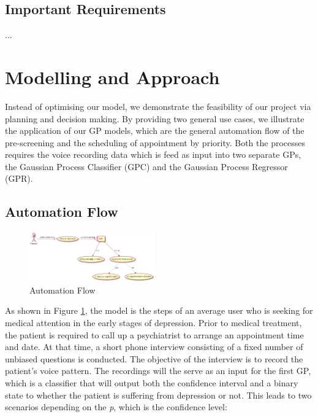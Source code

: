 \documentclass{article}
\begin{document}
	\subsection{Important Requirements}
	...
	
	\section{Modelling and Approach}
	Instead of optimising our model, we demonstrate the feasibility of our project via planning and decision making.
	By providing two general use cases, we illustrate the application of our GP models, which are the general automation flow of the pre-screening and the scheduling of appointment by priority.
	Both the processes requires the voice recording data which is feed as input into two separate GPs, the Gaussian Process Classifier (GPC) and the Gaussian Process Regressor (GPR). 

	\subsection{Automation Flow} \label{af}
	\begin{figure}[h]
 		\begin{center}
		\includegraphics[width=0.48\textwidth]{automation} 
  		\end{center}
  		\caption{Automation Flow}
  		\label{auto_flow} 
 	\end{figure}

	As shown in Figure \ref{auto_flow}, the model is the steps of an average user who is seeking for medical attention in the early stages of depression.
	Prior to medical treatment, the patient is required to call up a psychiatrist to arrange an appointment time and date. 
	At that time, a short phone interview consisting of a fixed number of unbiased questions is conducted.
	The objective of the interview is to record the patient's voice pattern.
	The recordings will the serve as an input for the first GP, which is a classifier that will output both the confidence interval and a binary state to whether the patient is suffering from depression or not.
	This leads to two scenarios depending on the \emph{p}, which is the confidence level:
	
\end{document}

